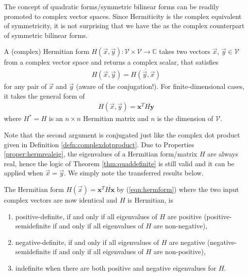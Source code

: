 The concept of quadratic forms/symmetric bilinear forms can be readily promoted to complex vector spaces. Since Hermiticity is the complex equivalent of symmetricity, it is not surprising that we have the  as the complex counterpart of symmetric bilinear forms.
\begin{defn}
A (complex) Hermitian form $H(\vec{x}, \vec{y}): \mathcal{V} \times \mathcal{V} \to \mathbb{C}$ takes two vectors $\vec{x}$, $\vec{y} \in \mathcal{V}$ from a complex vector space and returns a complex scalar, that satisfies 
\begin{align}
H(\vec{x}, \vec{y}) = \overline{H(\vec{y}, \vec{x})}
\end{align} for any pair of $\vec{x}$ and $\vec{y}$ (aware of the conjugation!). For finite-dimensional cases, it takes the general form of
\begin{align}
H(\vec{x}, \vec{y}) = \textbf{x}^T \overline{H \textbf{y}} \label{eqn:hermform}
\end{align}
where $H^* = H$ is an $n \times n$ Hermitian matrix and $n$ is the dimension of $\mathcal{V}$.
\end{defn}
Note that the second argument is conjugated just like the complex dot product given in Definition \ref{defn:complexdotproduct}. Due to Properties \ref{proper:hermrealeig}, the eigenvalues of a Hermitian form/matrix $H$ are always real, hence the logic of Theorem \ref{thm:quaddefinite} is still valid and it can be applied when $\vec{x} = \vec{y}$. We simply note the transferred results below.
\begin{thm}
\label{thm:hermdefinite}
The Hermitian form $H(\vec{x}) = \textbf{x}^T \overline{H\textbf{x}}$ by (\ref{eqn:hermform}) where the two input complex vectors are now identical and $H$ is Hermitian, is
\begin{enumerate}[label=(\alph*)]
\item positive-definite, if and only if all eigenvalues of $H$ are positive (positive-semidefinite if and only if all eigenvalues of $H$ are non-negative), 
\item negative-definite, if and only if all eigenvalues of $H$ are negative (negative-semidefinite if and only if all eigenvalues of $H$ are non-positive), 
\item indefinite when there are both positive and negative eigenvalues for $H$.
\end{enumerate}
\end{thm}

